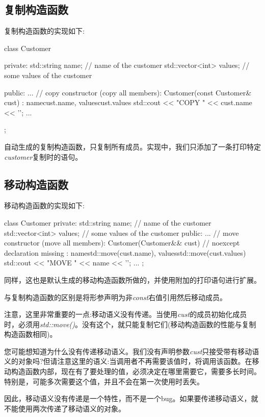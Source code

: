 \subsection{复制构造函数}

复制构造函数的实现如下:

\begin{cppcode}
class Customer {
private:
	std::string name; // name of the customer
	std::vector<int> values; // some values of the customer
	
public:
	...
	// copy constructor (copy all members):
	Customer(const Customer& cust)
	: name{cust.name}, values{cust.values} {
		std::cout << "COPY " << cust.name << '\n';
	}
	...
};
\end{cppcode}

自动生成的复制构造函数，只复制所有成员。实现中，我们只添加了一条打印特定\textit{customer}复制时的语句。

\subsection{移动构造函数}

移动构造函数的实现如下:

\begin{cppcode}
class Customer {
private:
	std::string name; // name of the customer
	std::vector<int> values; // some values of the customer
public:
	...
	// move constructor (move all members):
	Customer(Customer&& cust) // noexcept declaration missing
	: name{std::move(cust.name)}, values{std::move(cust.values)} {
		std::cout << "MOVE " << name << '\n';
	}
	...
};
\end{cppcode}

同样，这也是默认生成的移动构造函数所做的，并使用附加的打印语句进行扩展。

与复制构造函数的区别是将形参声明为非\textit{const}右值引用然后移动成员。

注意，这里非常重要的一点:移动语义没有传递。当使用\textit{cust}的成员初始化成员时，必须用\textit{std::move()}。没有这个，就只能复制它们(移动构造函数的性能与复制构造函数相同)。

您可能想知道为什么没有传递移动语义。我们没有声明参数\textit{cust}只接受带有移动语义的对象吗?但请注意这里的语义:当调用者不再需要该值时，将调用该函数。在移动构造函数内部，现在有了要处理的值，必须决定在哪里需要它，需要多长时间。特别是，可能多次需要这个值，并且不会在第一次使用时丢失。

因此，移动语义没有传递是一个特性，而不是一个bug。如果要传递移动语义，就不能使用两次传递了移动语义的对象。

